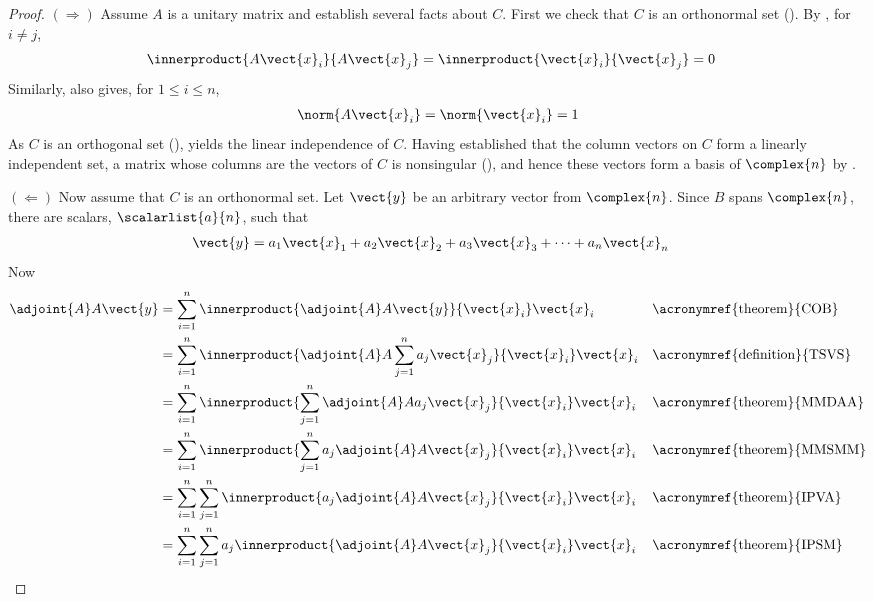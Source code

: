 \begin{proof}
%
$\left(\Rightarrow\right)$\quad
Assume $A$ is a unitary matrix and establish several facts about $C$.  First we check that $C$ is an orthonormal set ().  By , for $i\neq j$, 
%
\begin{align*}
\innerproduct{A\vect{x}_i}{A\vect{x}_j}&
=\innerproduct{\vect{x}_i}{\vect{x}_j}=0
\end{align*}
%
Similarly,  also gives, for $1\leq i\leq n$,
%
\begin{align*}
\norm{A\vect{x}_i}=\norm{\vect{x}_i}=1
\end{align*}
%
As $C$ is an orthogonal set (),  yields the linear independence of $C$.  Having established that the column vectors on $C$ form a linearly independent set, a matrix whose columns are the vectors of $C$ is nonsingular (), and hence these vectors form a basis of $\complex{n}$ by .\par
%
$\left(\Leftarrow\right)$\quad
Now assume that $C$ is an orthonormal set.  Let $\vect{y}$ be an arbitrary vector from $\complex{n}$.  Since $B$ spans $\complex{n}$, there are scalars, $\scalarlist{a}{n}$, such that
%
\begin{align*}
\vect{y}&=a_1\vect{x}_1+a_2\vect{x}_2+a_3\vect{x}_3+\cdots+a_n\vect{x}_n
\end{align*}
%
Now
%
\begin{align*}
\adjoint{A}A\vect{y}
&=\sum_{i=1}^{n}\innerproduct{\adjoint{A}A\vect{y}}{\vect{x}_i}\vect{x}_i
&&\text{\acronymref{theorem}{COB}}\\
%
&=\sum_{i=1}^{n}\innerproduct{\adjoint{A}A\sum_{j=1}^{n}a_j\vect{x}_j}{\vect{x}_i}\vect{x}_i
&&\text{\acronymref{definition}{TSVS}}\\
%
&=\sum_{i=1}^{n}\innerproduct{\sum_{j=1}^{n}\adjoint{A}Aa_j\vect{x}_j}{\vect{x}_i}\vect{x}_i
&&\text{\acronymref{theorem}{MMDAA}}\\
%
&=\sum_{i=1}^{n}\innerproduct{\sum_{j=1}^{n}a_j\adjoint{A}A\vect{x}_j}{\vect{x}_i}\vect{x}_i
&&\text{\acronymref{theorem}{MMSMM}}\\
%
&=\sum_{i=1}^{n}\sum_{j=1}^{n}\innerproduct{a_j\adjoint{A}A\vect{x}_j}{\vect{x}_i}\vect{x}_i
&&\text{\acronymref{theorem}{IPVA}}\\
%
&=\sum_{i=1}^{n}\sum_{j=1}^{n}a_j\innerproduct{\adjoint{A}A\vect{x}_j}{\vect{x}_i}\vect{x}_i
&&\text{\acronymref{theorem}{IPSM}}\\

\end{align*}
\end{proof}
